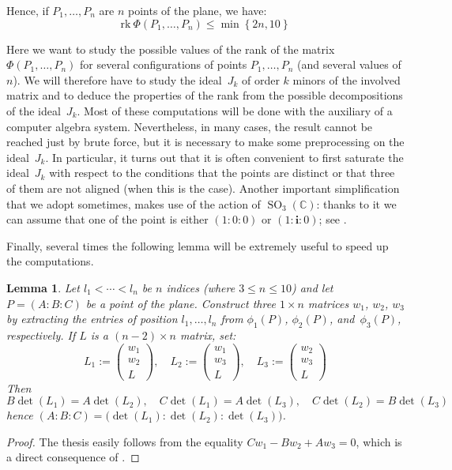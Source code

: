 \documentclass[12pt, a4paper, reqno, captions=tableheading,bibliography=totoc]{scrartcl}
\theoremstyle{plain}
\newtheorem{lemma}{Lemma}[section]
\theoremstyle{definition}
\newcommand{\C}{\mathbb{C}}
\newcommand{\SO}{\operatorname{SO}}
\newcommand{\iii}{\textbf{i}}
\begin{document}
Hence, if $P_1, \dots, P_n$ are $n$ points of the plane, we have:
\begin{equation}
\label{bound_rank}
\text{rk} \  \Phi(P_1, \dots, P_n) \leq \min \left\{2n, 10 \right\}
\end{equation}

Here we want to study the possible values of the rank of the matrix
$\Phi(P_1, \dots, P_n)$ for several configurations of points $P_1, \dots, P_n$
(and several values of $n$).
We will therefore have to study the ideal~$J_k$ of order $k$ minors of the
involved matrix and to deduce the properties of the rank from the possible
decompositions of the ideal~$J_k$. Most of these computations will be done
with the auxiliary of a computer algebra system. Nevertheless, in many cases,
the result cannot be reached just by brute force, but it is necessary to
make some preprocessing on the ideal~$J_k$. In particular, it turns out that
it is often convenient to first saturate the ideal~$J_k$ with respect to
the conditions that the
points are distinct or that three of them are not aligned (when this is the
case). Another important simplification that we adopt sometimes, makes use
of the action of $\SO_3(\C)$: thanks to it we can assume that one of
the point is either $(1: 0: 0)$ or $(1: \iii: 0)$; see .

Finally, several times the following lemma will be extremely useful
to speed up the computations.

\begin{lemma}
\label{lemma:minors}
Let $l_1 < \cdots <l_n$ be $n$ indices (where $3 \leq n \leq 10$) and let $P = (A: B: C)$ be a point of the plane.
Construct three $1 \times n$ matrices $w_1$, $w_2$, $w_3$ by extracting the entries of position $l_1, \dotsc, l_n$ from $\phi_1(P)$, $\phi_2(P)$, and~$\phi_3(P)$, respectively. If $L$ is a $(n-2) \times n$ matrix, set:
  \[
  L_1 := \left(\begin{array}{c}w_1 \\ w_2 \\ L\end{array}  \right), \quad
  L_2 := \left(\begin{array}{c}w_1 \\ w_3 \\ L\end{array}  \right), \quad
  L_3 := \left(\begin{array}{c}w_2 \\ w_3 \\ L\end{array}  \right)
  \]
  Then
  \[
  B \det(L_1) = A \det(L_2), \quad
  C \det(L_1) = A \det(L_3), \quad
  C \det(L_2) = B \det(L_3)
  \]
  hence $(A: B: C) = \bigl( \det(L_1): \det(L_2): \det(L_3) \bigr)$.
\end{lemma}
\begin{proof}
  The thesis easily follows from the equality $C w_1 - B w_2 + A w_3 = 0$, which is a direct consequence of .
\end{proof}
\end{document}

